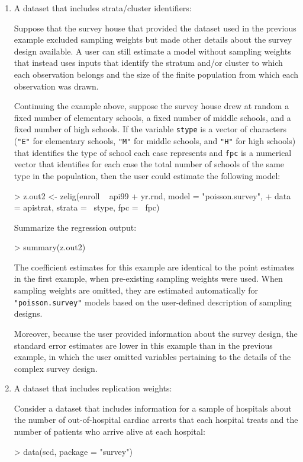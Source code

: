 \begin{enumerate}
\item  A dataset that includes strata/cluster identifiers:

Suppose that the survey house that provided the dataset used in the
previous example excluded sampling weights but made other details
about the survey design available.  A user can still estimate a model
without sampling weights that instead uses inputs that identify the
stratum and/or cluster to which each observation belongs and the
size of the finite population from which each observation was drawn.

Continuing the example above, suppose the survey house drew at
random a fixed number of elementary schools, a fixed number of
middle schools, and a fixed number of high schools. If the variable
{\tt stype} is a vector of characters ({\tt "E"} for elementary
schools, {\tt "M"} for middle schools, and {\tt "H"} for high schools)
that identifies the type of school each case
represents and {\tt fpc} is a numerical vector that identifies for
each case the total number of schools of the same type in the
population, then the user could estimate the following model:

\begin{Schunk}
\begin{Sinput}
> z.out2 <- zelig(enroll ~ api99 + yr.rnd, model = "poisson.survey", 
+     data = apistrat, strata = ~stype, fpc = ~fpc)
\end{Sinput}
\end{Schunk}
Summarize the regression output:
\begin{Schunk}
\begin{Sinput}
> summary(z.out2)
\end{Sinput}
\end{Schunk}
The coefficient estimates for this example are
identical to the point estimates in the first example, when
pre-existing sampling weights were used.  When sampling weights are
omitted, they are estimated automatically for {\tt "poisson.survey"}
models based on the user-defined description of sampling designs. 

Moreover, because the user provided information about the survey
design, the standard error estimates are lower in this example than
in the previous example, in which the user omitted variables pertaining
to the details of the complex survey design.

\item A dataset that includes replication weights:

Consider a dataset that includes information for a sample of hospitals
about the number of out-of-hospital cardiac arrests that each
hospital treats and the number of patients who arrive alive
at each hospital: 
\begin{Schunk}
\begin{Sinput}
> data(scd, package = "survey")
\end{Sinput}
\end{Schunk}


\end{enumerate}
